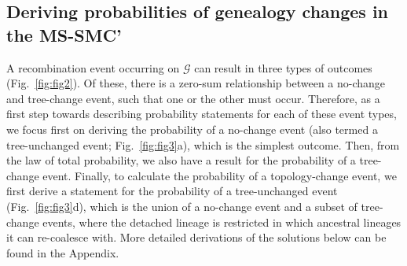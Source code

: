 \documentclass[11pt]{article}
\begin{document}


\subsection{Deriving probabilities of genealogy changes in the MS-SMC'}
A recombination event occurring on $\mathcal{G}$ can result 
in three types of outcomes (Fig.~\ref{fig:fig2}).
Of these, there is a zero-sum relationship between a no-change and 
tree-change event, such that one or the other must occur.
Therefore, as a first step towards describing probability statements 
for each of these event types, we focus first on deriving the 
probability of a no-change event 
(also termed a tree-unchanged event; Fig.~\ref{fig:fig3}a), 
which is the simplest outcome. Then, from the law of total probability, 
we also have a result for the probability of a tree-change event. 
Finally, to calculate the probability of a topology-change event, 
we first derive a statement for the probability of a tree-unchanged event
(Fig.~\ref{fig:fig3}d), which is the union of a no-change event and
a subset of tree-change events,
where the detached lineage is restricted in which ancestral lineages 
it can re-coalesce with. 
More detailed derivations of the solutions below can be found in the Appendix.
\end{document}
